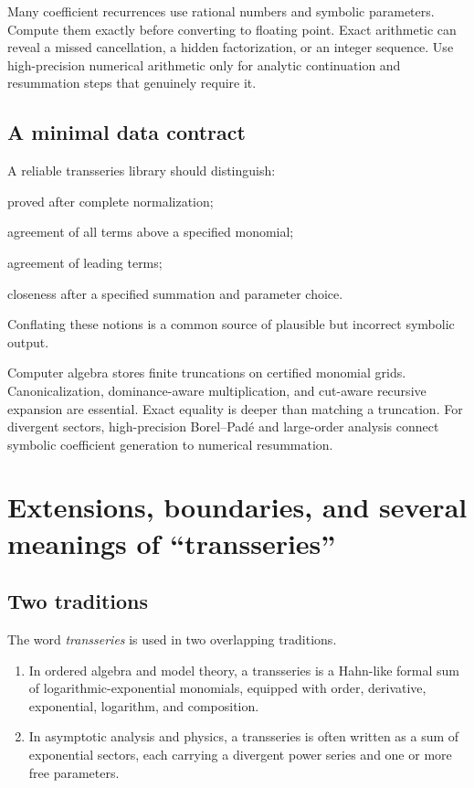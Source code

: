 \documentclass[11pt,oneside]{book}
\theoremstyle{definition}
\theoremstyle{remark}
\begin{document}
Many coefficient recurrences use rational numbers and symbolic parameters.
Compute them exactly before converting to floating point. Exact arithmetic can
reveal a missed cancellation, a hidden factorization, or an integer sequence.
Use high-precision numerical arithmetic only for analytic continuation and
resummation steps that genuinely require it.

\section{A minimal data contract}

A reliable transseries library should distinguish:
\begin{description}[style=nextline]
\item[Formal equality]
proved after complete normalization;
\item[Equality modulo a cut]
agreement of all terms above a specified monomial;
\item[Asymptotic equivalence]
agreement of leading terms;
\item[Numerical agreement]
closeness after a specified summation and parameter choice.
\end{description}
Conflating these notions is a common source of plausible but incorrect symbolic
output.

\begin{summarybox}
Computer algebra stores finite truncations on certified monomial grids.
Canonicalization, dominance-aware multiplication, and cut-aware recursive
expansion are essential. Exact equality is deeper than matching a truncation.
For divergent sectors, high-precision Borel--Pad\'e and large-order analysis
connect symbolic coefficient generation to numerical resummation.
\end{summarybox}


\chapter{Extensions, boundaries, and several meanings of ``transseries''}
\label{ch:boundaries}

\section{Two traditions}

The word \emph{transseries} is used in two overlapping traditions.

\begin{enumerate}
\item In ordered algebra and model theory, a transseries is a Hahn-like formal
sum of logarithmic-exponential monomials, equipped with order, derivative,
exponential, logarithm, and composition.
\item In asymptotic analysis and physics, a transseries is often written as a
sum of exponential sectors, each carrying a divergent power series and one or
more free parameters.
\end{enumerate}
\end{document}
